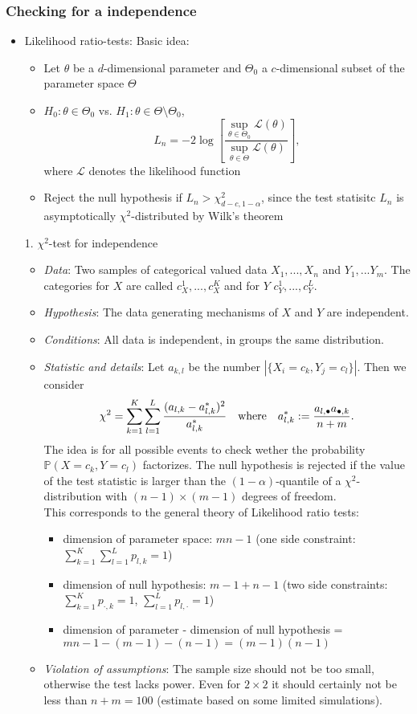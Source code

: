 \documentclass[12pt,a4paper]{amsart}
\theoremstyle{definition}
\theoremstyle{remark}
\numberwithin{equation}{section}
\begin{document}
\subsubsection{Checking for a independence}

\begin{itemize}
\item Likelihood ratio-tests: Basic idea:
\begin{itemize}
\item Let $\theta$ be a $d$-dimensional parameter and $\Theta_0$ a $c$-dimensional subset of the parameter space $\Theta$
\item $H_0: \theta\in \Theta_0$ vs. $H_1:\theta\in \Theta\setminus \Theta_0$,
$$L_n=-2\log\left[\frac{\sup_{\theta\in\Theta_0} \mathcal{L}(\theta)}{\sup_{\theta\in\Theta} \mathcal{L}(\theta)}\right],$$
where $\mathcal{L}$ denotes the likelihood function
\item Reject the null hypothesis if $L_n>\chi^2_{d-c,1-\alpha}$, since the test statisitc $L_n$ is asymptotically $\chi^2$-distributed by Wilk's theorem 
\end{itemize}
\item[1.] $\chi^2$-test for independence
\begin{itemize}
\item \textit{Data}: Two samples of categorical valued data $X_1,...,X_n$ and $Y_1,...Y_m$. The categories for $X$ are called $c_X^1,...,c_X^K$ and for $Y$ $c_Y^1,...,c_Y^L$. 
\item \textit{Hypothesis}: The data generating mechanisms of $X$ and $Y$ are independent.
\item \textit{Conditions}: All data is independent, in groups the same distribution.
\item \textit{Statistic and details}: Let $a_{k,l}$ be the number  $|\{X_i=c_k, Y_j=c_l\}|$. Then we consider 
$$\chi^2=\sum_{k=1}^K \sum_{l=1} ^L \frac{(a_{l,k}-a_{l,k}^*)^2}{a_{l,k}^*} \quad \textnormal{where} \quad a_{l,k}^*:=\frac{a_{l, \bullet}a_{\bullet,k}}{n+m}.$$
The idea is for all possible events to check wether the probability $\mathbb{P}(X=c_k, Y=c_l)$ factorizes. The null hypothesis is rejected if the value of the test statistic is larger than the $(1-\alpha)$-quantile of a $\chi^2$-distribution with $(n-1)\times (m-1)$ degrees of freedom.\\
This corresponds to the general theory of Likelihood ratio tests: 
\begin{itemize}
\item dimension of parameter space: $mn-1$ (one side constraint: $\sum_{k=1}^K \sum_{l=1}^L p_{l,k}=1$)
\item dimension of null hypothesis: $m-1+n-1$ (two side constraints: $\sum_{k=1}^K p_{\cdot,k}=1$, $\sum_{l=1}^L p_{l,\cdot}=1$)
\item dimension of parameter - dimension of null hypothesis = $mn-1-(m-1)-(n-1)=(m-1)(n-1)$
\end{itemize}
\item \textit{Violation of assumptions}: The sample size should not be too small, otherwise the test lacks power. Even for $2\times 2$ it should certainly not be less than $n+m=100$ (estimate based on some limited simulations).


\end{itemize}
\end{itemize}
\end{document}
